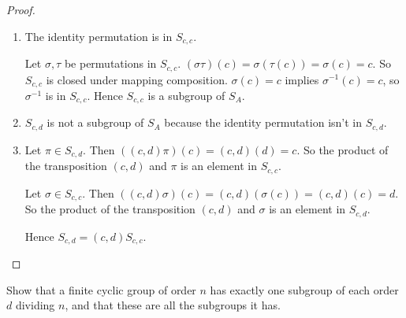 \begin{proof}
    \begin{enumerate}[label={\textbf{\alph*.}}]
        \item The identity permutation is in $S_{c,c}$.

              Let $\sigma,\tau$ be permutations in $S_{c,c}$. $(\sigma\tau)(c) = \sigma(\tau(c)) = \sigma(c) = c$. So $S_{c,c}$ is closed under mapping composition. $\sigma(c) = c$ implies $\sigma^{-1}(c) = c$, so $\sigma^{-1}$ is in $S_{c,c}$. Hence $S_{c,c}$ is a subgroup of $S_{A}$.
        \item $S_{c,d}$ is not a subgroup of $S_{A}$ because the identity permutation isn't in $S_{c,d}$.
        \item Let $\pi\in S_{c,d}$. Then $((c,d)\pi)(c) = (c,d)(d) = c$. So the product of the transposition $(c,d)$ and $\pi$ is an element in $S_{c,c}$.

            Let $\sigma\in S_{c,c}$. Then $((c,d)\sigma)(c) = (c,d)(\sigma(c)) = (c,d)(c) = d$. So the product of the transposition $(c,d)$ and $\sigma$ is an element in $S_{c,d}$.

            Hence $S_{c,d} = (c,d)S_{c,c}$.
    \end{enumerate}
\end{proof}

\begin{exercise}
    Show that a finite cyclic group of order $n$ has exactly one subgroup of each order $d$ dividing $n$, and that these are all the subgroups it has.
\end{exercise}

